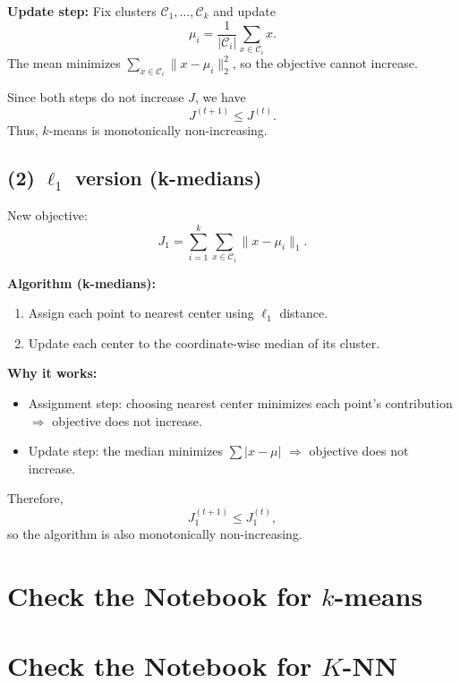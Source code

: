 \documentclass[11pt]{article}
\begin{document}
\textbf{Update step:}  
Fix clusters $\mathcal{C}_1,\dots,\mathcal{C}_k$ and update
\[
\mu_i = \frac{1}{|\mathcal{C}_i|} \sum_{x \in \mathcal{C}_i} x.
\]
The mean minimizes $\sum_{x \in \mathcal{C}_i} \|x - \mu_i\|_2^2$, so the objective cannot increase.

\medskip
Since both steps do not increase $J$, we have
\[
J^{(t+1)} \le J^{(t)}.
\]
Thus, $k$-means is monotonically non-increasing.

\bigskip

\subsection*{(2) $\ell_1$ version (k-medians)}

New objective:
\[
J_1 = \sum_{i=1}^k \sum_{x \in \mathcal{C}_i} \|x - \mu_i\|_1.
\]

\textbf{Algorithm (k-medians):}
\begin{enumerate}
    \item Assign each point to nearest center using $\ell_1$ distance.
    \item Update each center to the coordinate-wise median of its cluster.
\end{enumerate}

\textbf{Why it works:}
\begin{itemize}
    \item Assignment step: choosing nearest center minimizes each point’s contribution $\Rightarrow$ objective does not increase.
    \item Update step: the median minimizes $\sum |x - \mu|$ $\Rightarrow$ objective does not increase.
\end{itemize}

\medskip
Therefore,
\[
J_1^{(t+1)} \le J_1^{(t)},
\]
so the algorithm is also monotonically non-increasing.

\newpage
\section*{Check the Notebook for $k$-means}
\newpage
\section*{Check the Notebook for $K$-NN}
\end{document}
